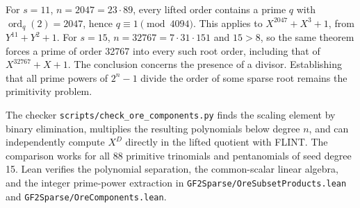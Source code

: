 \documentclass[11pt]{article}
\begin{document}
For \(s=11\), \(n=2047=23\cdot89\), every lifted order contains a
prime \(q\) with \(\operatorname{ord}_q(2)=2047\), hence
\(q\equiv1\pmod{4094}\). This applies to \(X^{2047}+X^3+1\),
from \(Y^{11}+Y^2+1\). For \(s=15\), \(n=32767=7\cdot31\cdot151\)
and \(15>8\), so the same theorem forces a prime of order 32767
into every such root order, including that of \(X^{32767}+X+1\).
The conclusion concerns the presence of a divisor. Establishing that
all prime powers of \(2^n-1\) divide the order of some sparse root
remains the primitivity problem.

The checker \nolinkurl{scripts/check_ore_components.py} finds the
scaling element by binary elimination, multiplies the resulting
polynomials below degree \(n\), and can independently compute
\(X^D\) directly in the lifted quotient with FLINT. The comparison
works for all 88 primitive trinomials and pentanomials of seed
degree 15. Lean verifies the polynomial separation, the common-scalar
linear algebra, and the integer prime-power extraction in
\nolinkurl{GF2Sparse/OreSubsetProducts.lean} and
\nolinkurl{GF2Sparse/OreComponents.lean}.
\end{document}
